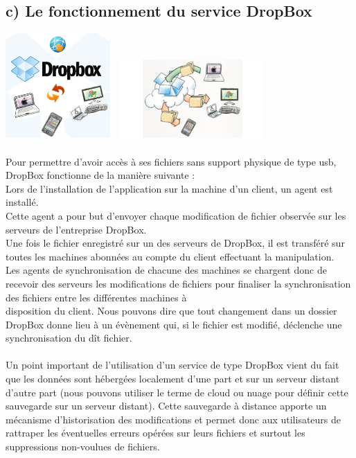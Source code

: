 \documentclass[a4paper, 10pt]{article}
\begin{document}
\subsection*{c) Le fonctionnement du service DropBox}
\includegraphics[height = 4cm, width = 4cm]{jpg/dropbox_1.png}
\includegraphics[height = 3cm, width = 6cm]{jpg/dropbox_3.jpg}\\ \\
Pour permettre d'avoir accès à ses fichiers sans support physique de type usb, DropBox fonctionne de la manière suivante :\\
Lors de l'installation de l'application sur la machine d'un client, un agent est installé.\\
Cette agent a pour but d'envoyer chaque modification de fichier observée sur les serveurs de l'entreprise DropBox.\\
Une fois le fichier enregistré sur un des serveurs de DropBox, il est transféré sur toutes les machines abonnées
au compte du client effectuant la manipulation.\\
Les agents de synchronisation de chacune des machines se chargent donc de recevoir des serveurs les modifications de fichiers pour
finaliser la synchronisation des fichiers entre les différentes machines à\\disposition du client.
Nous pouvons dire que tout changement dans un dossier DropBox donne lieu à un évènement qui, si le fichier est modifié,
déclenche une synchronisation du dît fichier.\\ \\
Un point important de l'utilisation d'un service de type DropBox vient du fait que les données sont hébergées localement d'une part
et sur un serveur distant d'autre part (nous pouvons utiliser le terme de cloud ou nuage pour définir cette sauvegarde sur un serveur distant).
Cette sauvegarde à distance apporte un mécanisme d'historisation des modifications et 
permet donc aux utilisateurs de rattraper les éventuelles erreurs opérées sur leurs fichiers et
surtout les suppressions non-voulues de fichiers.
\end{document}
